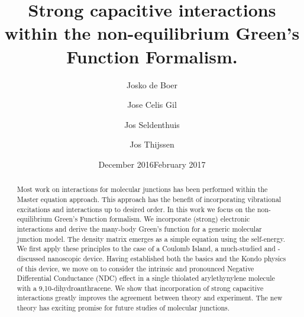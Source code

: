 \documentclass{article}
\title{Strong capacitive interactions within the non-equilibrium Green's Function Formalism.}
\author{Josko de Boer \and Jose Celis Gil \and Jos Seldenthuis \and Jos Thijssen}
\date{December 2016}
\date{February 2017}
\begin{document}
\maketitle
\begin{abstract}
    Most work on interactions for molecular junctions has been performed within the Master equation approach. This approach has the benefit of incorporating vibrational excitations and interactions up to desired order. In this work we focus on the non-equilibrium Green's Function formalism. We incorporate (strong) electronic interactions and derive the many-body Green's function for a generic molecular junction model. The density matrix emerges as a simple equation using the self-energy. We first apply these principles to the case of a Coulomb Island, a much-studied and -discussed nanoscopic device.  Having established both the basics and the Kondo physics of this device, we move on to consider the intrinsic and pronounced Negative Differential Conductance (NDC) effect in a single thiolated arylethynylene molecule with a 9,10-dihydroanthracene. We show that incorporation of strong capacitive interactions greatly improves the agreement between theory and experiment. The new theory has exciting promise for future studies of molecular junctions.
\end{abstract}
\end{document}

